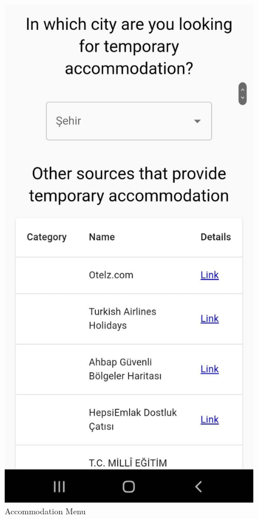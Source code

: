 \begin{figure}[H]
    \begin{center}
        \includegraphics[scale = 0.15]{assets/accommodation.jpeg}
        \caption[Accommodation Menu]{Accommodation Menu}
    \end{center}
\end{figure}

